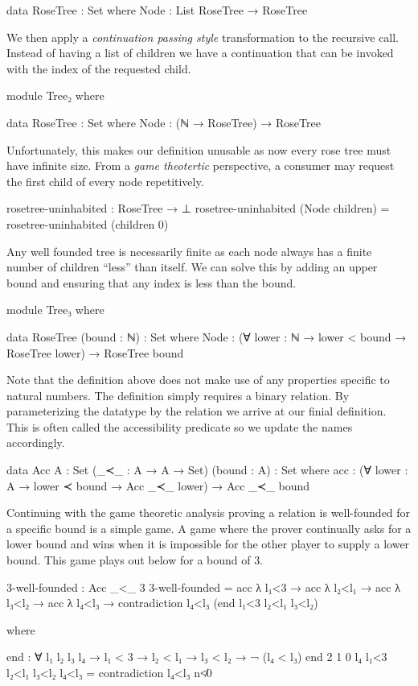 \documentclass[./Thesis.tex]{subfiles}
\begin{document}
\begin{code}
    data RoseTree : Set where
      Node : List RoseTree → RoseTree
\end{code}
We then apply a \textit{continuation passing style} \cite{harper} transformation to the
recursive call. Instead of having a list of children we have a continuation that
can be invoked with the index of the requested child.
\begin{code}[hide]
  module Tree₂ where
\end{code}
\begin{code}
    data RoseTree : Set where
      Node : (ℕ → RoseTree) → RoseTree
\end{code}
Unfortunately, this makes our definition unusable as now every rose tree must have
infinite size. From a \textit{game theotertic} perspective, a consumer may request
the first child of every node repetitively.
\begin{code}
    rosetree-uninhabited : RoseTree → ⊥
    rosetree-uninhabited (Node children) = rosetree-uninhabited (children 0)
\end{code}
Any well founded tree is necessarily finite as each node always has a finite
number of children ``less'' than itself. We can solve this by adding an upper
bound and ensuring that any index is less than the bound.
\begin{code}[hide]
  module Tree₃ where
\end{code}
\begin{code}
    data RoseTree (bound : ℕ) : Set where
      Node : (∀ {lower : ℕ} → lower < bound → RoseTree lower)
           → RoseTree bound
\end{code}
Note that the definition above does not make use of any properties specific to
natural numbers. The definition simply requires a binary relation.
By parameterizing the datatype by the relation we
arrive at our finial definition. This is often called the accessibility
predicate so we update the names accordingly.
\begin{code}
  data Acc {A : Set} (_≺_ : A → A → Set) (bound : A) : Set where
    acc : (∀ {lower : A} → lower ≺ bound → Acc _≺_ lower)
        → Acc _≺_ bound
\end{code}
Continuing with the game theoretic analysis proving a relation is well-founded
for a specific bound is a simple game. A game where the prover
continually asks for a lower bound and wins when it is impossible for the
other player to supply a lower bound. This game plays out below for a bound of $3$.
\begin{code}
  3-well-founded : Acc _<_ 3
  3-well-founded = acc λ l₁<3 → acc λ l₂<l₁ → acc λ l₃<l₂ → acc λ l₄<l₃ →
    contradiction l₄<l₃ (end l₁<3 l₂<l₁ l₃<l₂)
\end{code}
\begin{code}[hide]
    where
\end{code}
\begin{code}
    end : ∀ {l₁ l₂ l₃ l₄} → l₁ < 3 → l₂ < l₁ → l₃ < l₂ → ¬ (l₄ < l₃)
    end {2} {1} {0} {l₄} l₁<3 l₂<l₁ l₃<l₂ l₄<l₃ = contradiction l₄<l₃ n≮0 
\end{code}
\end{document}
